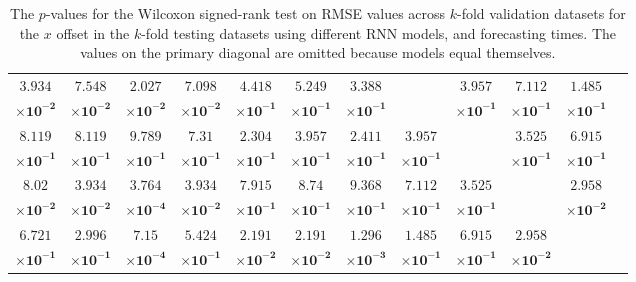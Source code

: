 \begin{table}[!ht]
{\begin{tabular}{|c|c|c|c|c|c|c|c|c|c|c|c|c|c|c|c|}
			$\mathbf{3.934}$ & $\mathbf{7.548}$ & $\mathbf{2.027}$ & $\mathbf{7.098}$ & $\mathbf{4.418}$ & $\mathbf{5.249}$ & $\mathbf{3.388}$ & \multirow{2}{*}{} & $\mathbf{3.957}$ & $\mathbf{7.112}$ & $\mathbf{1.485}$ & \multicolumn{5}{c}{} \\ 
			$\mathbf{\times 10^{-2}}$ & $\mathbf{\times 10^{-2}}$ & $\mathbf{\times 10^{-2}}$ & $\mathbf{\times 10^{-2}}$ & $\mathbf{\times 10^{-1}}$ & $\mathbf{\times 10^{-1}}$ & $\mathbf{\times 10^{-1}}$ & & $\mathbf{\times 10^{-1}}$ & $\mathbf{\times 10^{-1}}$ & $\mathbf{\times 10^{-1}}$ & \multicolumn{5}{c}{} \\ \cline{1-11}
			$\mathbf{8.119}$ & $\mathbf{8.119}$ & $\mathbf{9.789}$ & $\mathbf{7.31}$ & $\mathbf{2.304}$ & $\mathbf{3.957}$ & $\mathbf{2.411}$ & $\mathbf{3.957}$ & \multirow{2}{*}{} & $\mathbf{3.525}$ & $\mathbf{6.915}$ & \multicolumn{5}{c}{} \\ 
			$\mathbf{\times 10^{-1}}$ & $\mathbf{\times 10^{-1}}$ & $\mathbf{\times 10^{-1}}$ & $\mathbf{\times 10^{-1}}$ & $\mathbf{\times 10^{-1}}$ & $\mathbf{\times 10^{-1}}$ & $\mathbf{\times 10^{-1}}$ & $\mathbf{\times 10^{-1}}$ & & $\mathbf{\times 10^{-1}}$ & $\mathbf{\times 10^{-1}}$ & \multicolumn{5}{c}{} \\ \cline{1-11}
			$\mathbf{8.02}$ & $\mathbf{3.934}$ & $\mathbf{3.764}$ & $\mathbf{3.934}$ & $\mathbf{7.915}$ & $\mathbf{8.74}$ & $\mathbf{9.368}$ & $\mathbf{7.112}$ & $\mathbf{3.525}$ & \multirow{2}{*}{} & $\mathbf{2.958}$ & \multicolumn{5}{c}{} \\ 
			$\mathbf{\times 10^{-2}}$ & $\mathbf{\times 10^{-2}}$ & $\mathbf{\times 10^{-4}}$ & $\mathbf{\times 10^{-2}}$ & $\mathbf{\times 10^{-1}}$ & $\mathbf{\times 10^{-1}}$ & $\mathbf{\times 10^{-1}}$ & $\mathbf{\times 10^{-1}}$ & $\mathbf{\times 10^{-1}}$ & & $\mathbf{\times 10^{-2}}$ & \multicolumn{5}{c}{} \\ \cline{1-11}
			$\mathbf{6.721}$ & $\mathbf{2.996}$ & $\mathbf{7.15}$ & $\mathbf{5.424}$ & $\mathbf{2.191}$ & $\mathbf{2.191}$ & $\mathbf{1.296}$ & $\mathbf{1.485}$ & $\mathbf{6.915}$ & $\mathbf{2.958}$ & \multirow{2}{*}{} & \multicolumn{5}{c}{} \\ 
			$\mathbf{\times 10^{-1}}$ & $\mathbf{\times 10^{-1}}$ & $\mathbf{\times 10^{-4}}$ & $\mathbf{\times 10^{-1}}$ & $\mathbf{\times 10^{-2}}$ & $\mathbf{\times 10^{-2}}$ & $\mathbf{\times 10^{-3}}$ & $\mathbf{\times 10^{-1}}$ & $\mathbf{\times 10^{-1}}$ & $\mathbf{\times 10^{-2}}$ & & \multicolumn{5}{c}{} \\ \cline{1-12} \cline{14-14} \cline{16-16}
		\end{tabular}
	}
	\caption{The $p$-values for the Wilcoxon signed-rank test on RMSE values across $k$-fold validation datasets for the $x$ offset in the $k$-fold testing datasets using different RNN models, and forecasting times. The values on the primary diagonal are omitted because models equal themselves.}
	\label{tab:var_long_RMSE}
\end{table}